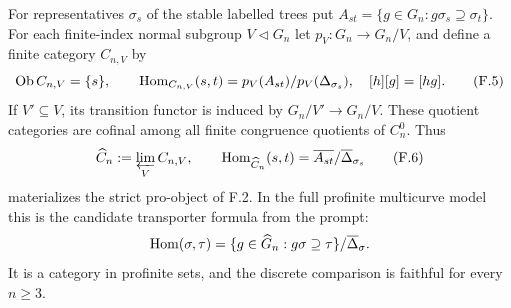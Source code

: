 For representatives $\sigma_s$ of the stable labelled trees put
$A_{st}=\{g\in G_n:g\sigma_s\supseteq\sigma_t\}$.
For each finite-index normal subgroup $V\lhd G_n$ let $p_V:G_n\to G_n/V$, and define a finite category $C_{n,V}$ by
\[
\operatorname{Ob}C_{n,V}=\{s\},\qquad
\operatorname{Hom}_{C_{n,V}}(s,t)=p_V(A_{st})/p_V(\Delta_{\sigma_s}),
\quad[h][g]=[hg].                                            \tag{F.5}
\]
If $V'\subseteq V$, its transition functor is induced by $G_n/V'\to G_n/V$. These quotient categories are cofinal among all finite congruence quotients of $C_n^0$. Thus
\[
\widehat C_n:=\varprojlim_V C_{n,V},\qquad
\operatorname{Hom}_{\widehat C_n}(s,t)=\overline{A_{st}}/\overline\Delta_{\sigma_s} \tag{F.6}
\]
materializes the strict pro-object of F.2. In the full profinite multicurve model this is the candidate transporter formula from the prompt:
\[
\operatorname{Hom}(\sigma,\tau)=
 \{g\in\widehat G_n:g\sigma\supseteq\tau\}/\overline\Delta_\sigma.
\]
It is a category in profinite sets, and the discrete comparison is faithful for every $n\geq3$.
